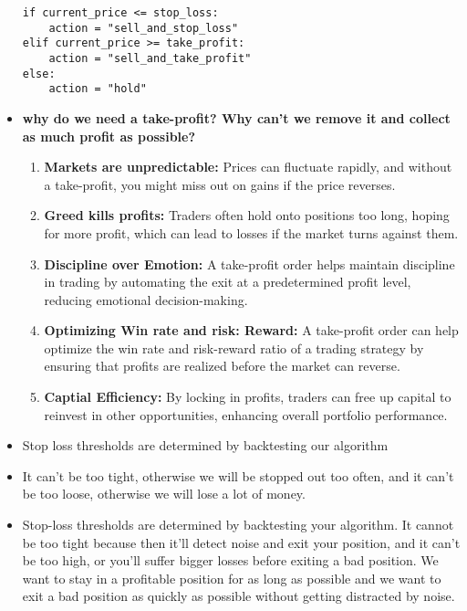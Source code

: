 \documentclass{article}
\begin{document}
\begin{itemize}
\begin{lstlisting}
if current_price <= stop_loss:
    action = "sell_and_stop_loss"
elif current_price >= take_profit:
    action = "sell_and_take_profit"
else:
    action = "hold"
    \end{lstlisting}
    \item \textbf{why do we need a take-profit? Why can’t we remove it and collect as much profit as possible? }
    \begin{enumerate}
        \item \textbf{Markets are unpredictable:} Prices can fluctuate rapidly, and without a take-profit, you might miss out on gains if the price reverses.
        \item \textbf{Greed kills profits: } Traders often hold onto positions too long, hoping for more profit, which can lead to losses if the market turns against them.
        \item \textbf{Discipline over Emotion:} A take-profit order helps maintain discipline in trading by automating the exit at a predetermined profit level, reducing emotional decision-making.
        \item \textbf{Optimizing Win rate and risk: Reward:} A take-profit order can help optimize the win rate and risk-reward ratio of a trading strategy by ensuring that profits are realized before the market can reverse.
        \item \textbf{Captial Efficiency:} By locking in profits, traders can free up capital to reinvest in other opportunities, enhancing overall portfolio performance.
    \end{enumerate}
    \item Stop loss thresholds are determined by backtesting our algorithm
    \item It can't be too tight, otherwise we will be stopped out too often, and it can't be too loose, otherwise we will lose a lot of money.
    \item Stop-loss thresholds are determined by backtesting your algorithm. It cannot be too tight because then it’ll detect noise and exit your position, and it can’t be too high, or you’ll suffer bigger losses before exiting a bad position. We want to stay in a profitable position for as long as possible and we want to exit a bad position as quickly as possible without getting distracted by noise.
\end{itemize}
\end{document}
